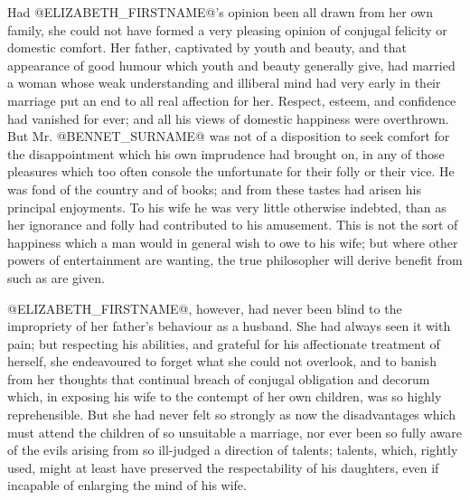 Had @ELIZABETH_FIRSTNAME@'s opinion been all drawn from her own family, she could
not have formed a very pleasing opinion of conjugal felicity or domestic
comfort. Her father, captivated by youth and beauty, and that appearance
of good humour which youth and beauty generally give, had married a
woman whose weak understanding and illiberal mind had very early in
their marriage put an end to all real affection for her. Respect,
esteem, and confidence had vanished for ever; and all his views
of domestic happiness were overthrown. But Mr. @BENNET_SURNAME@ was not of
a disposition to seek comfort for the disappointment which his own
imprudence had brought on, in any of those pleasures which too often
console the unfortunate for their folly or their vice. He was fond of
the country and of books; and from these tastes had arisen his principal
enjoyments. To his wife he was very little otherwise indebted, than as
her ignorance and folly had contributed to his amusement. This is not
the sort of happiness which a man would in general wish to owe to his
wife; but where other powers of entertainment are wanting, the true
philosopher will derive benefit from such as are given.

@ELIZABETH_FIRSTNAME@, however, had never been blind to the impropriety of her
father's behaviour as a husband. She had always seen it with pain; but
respecting his abilities, and grateful for his affectionate treatment of
herself, she endeavoured to forget what she could not overlook, and to
banish from her thoughts that continual breach of conjugal obligation
and decorum which, in exposing his wife to the contempt of her own
children, was so highly reprehensible. But she had never felt so
strongly as now the disadvantages which must attend the children of so
unsuitable a marriage, nor ever been so fully aware of the evils arising
from so ill-judged a direction of talents; talents, which, rightly used,
might at least have preserved the respectability of his daughters, even
if incapable of enlarging the mind of his wife.

